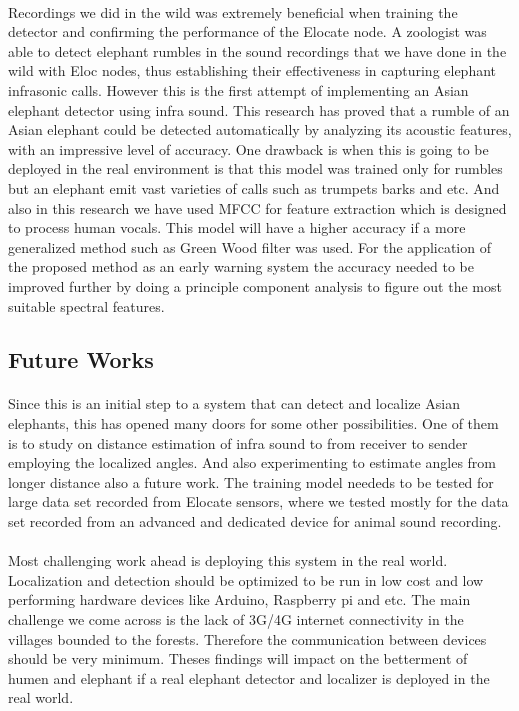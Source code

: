 \documentclass[12pt]{article}
\numberwithin{figure}{section}
\numberwithin{table}{section}
\begin{document}
\paragraph{}
Recordings we did in the wild was extremely beneficial when training the detector and confirming the performance of the Elocate node. A zoologist was able to detect elephant rumbles in the sound recordings that we have done in the wild with
Eloc nodes, thus establishing their effectiveness in capturing elephant infrasonic calls. However this is the first attempt of implementing an Asian elephant detector using infra sound. This research has proved that a rumble of an Asian elephant could be detected automatically by analyzing its acoustic features, with an impressive level of accuracy. One drawback is when this is going to be deployed in the real environment is that this model was trained only for rumbles but an elephant emit vast varieties of calls such as trumpets barks and etc. And also in this research we have used MFCC for feature extraction which is designed to process human vocals. This model will have a higher accuracy if a more generalized method such as Green Wood filter was used. For the application of the proposed method as an early warning system the accuracy needed to be improved further by doing a principle component analysis to figure out the most suitable spectral features.   

\subsection{Future Works} 
\paragraph{}
Since this is an initial step to a system that can detect and localize Asian elephants, this has opened many doors for some other possibilities. One of them is to study on distance estimation of infra sound to from receiver to sender employing the localized angles. And also experimenting to estimate angles from longer distance also a future work.
The training model neededs to be tested for large data set recorded from Elocate sensors, where we tested mostly for the data set recorded from an advanced and dedicated device for animal sound recording.  

\paragraph{}
Most challenging work ahead is deploying this system in the real world. Localization and detection should be optimized to be run in low cost and low performing hardware devices like Arduino, Raspberry pi and etc. The main challenge we come across is the lack of 3G/4G internet connectivity in the villages bounded to the forests. Therefore the communication between devices should be very minimum. Theses findings will impact on the betterment of humen and elephant if a real elephant detector and localizer is deployed in the real world. 
\end{document}
